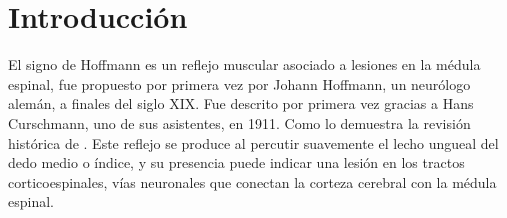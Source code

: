 \section{Introducción}
El signo de Hoffmann es un reflejo muscular asociado a lesiones en la médula espinal, fue propuesto por primera vez por Johann Hoffmann, un neurólogo alemán, a finales del siglo XIX. Fue descrito por primera vez gracias a Hans Curschmann, uno de sus asistentes, en 1911. Como lo demuestra la revisión histórica de \cite{ BENDHEIM}. Este reflejo se produce al percutir suavemente el lecho ungueal del dedo medio o índice, y su presencia puede indicar una lesión en los tractos corticoespinales, vías neuronales que conectan la corteza cerebral con la médula espinal.